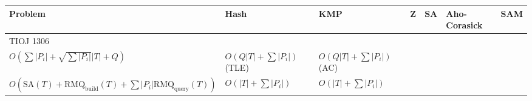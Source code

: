 \documentclass{standalone}
\begin{document}
\begin{tabular}{l | l | l | l | l | l | l}
  Problem & Hash & KMP  & Z   & SA  & Aho-Corasick & SAM \\\hline
  TIOJ 1306 & \makecell{$O(Q \lvert T \rvert + \sum \lvert P_i \rvert)$ (TLE) or \\
                        $O(\sum \lvert P_i \rvert + \sqrt{\sum \lvert P_i \rvert} \lvert T \rvert + Q)$ }
            & $O(Q \lvert T \rvert + \sum \lvert P_i \rvert)$ (TLE)
            & $O(Q \lvert T \rvert + \sum \lvert P_i \rvert)$ (AC)
            & \makecell{$O(\text{SA}(T) + \text{RMQ}_\text{build}(T) + \sum \lvert P_i \rvert \log \lvert T \rvert \text{RMQ}_\text{query}(T))$ or \\
                        $O(\text{SA}(T) + \text{RMQ}_\text{build}(T) + \sum \lvert P_i \rvert \text{RMQ}_\text{query}(T))$}
            & $O(\lvert T \rvert + \sum \lvert P_i \rvert)$ & $O(\lvert T \rvert + \sum \lvert P_i \rvert)$
\end{tabular}
\end{document}
